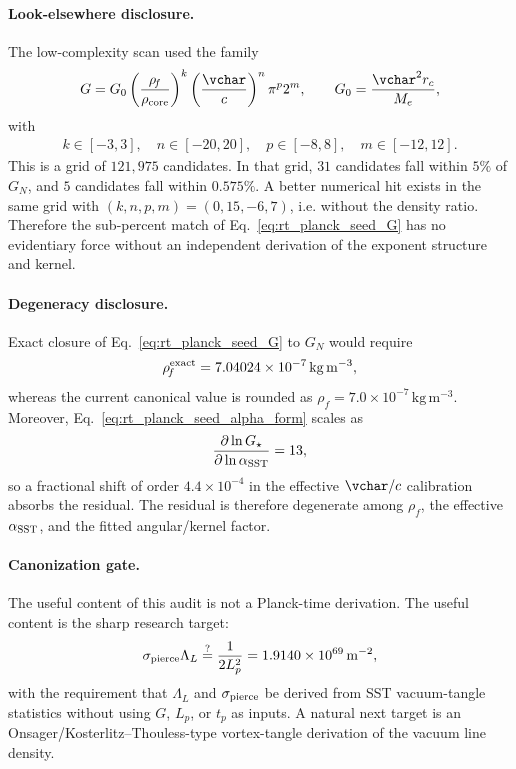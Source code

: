 \paragraph{Look-elsewhere disclosure.}
The low-complexity scan used the family
\begin{align}
    G
    =
    G_0
    \left(\frac{\rho_{\!f}}{\rho_{\rm core}}\right)^k
    \left(\frac{\vchar}{c}\right)^n
    \pi^p2^m,
    \qquad
    G_0=\frac{\vchar^2r_c}{M_e},
\end{align}
with
\begin{align}
    k\in[-3,3],\quad
    n\in[-20,20],\quad
    p\in[-8,8],\quad
    m\in[-12,12].
\end{align}
This is a grid of \(121{,}975\) candidates.  In that grid, \(31\) candidates
fall within \(5\%\) of \(G_N\), and \(5\) candidates fall within
\(0.575\%\).  A better numerical hit exists in the same grid with
\((k,n,p,m)=(0,15,-6,7)\), i.e. without the density ratio.  Therefore the
sub-percent match of Eq.~\eqref{eq:rt_planck_seed_G} has no evidentiary force
without an independent derivation of the exponent structure and kernel.

\paragraph{Degeneracy disclosure.}
Exact closure of Eq.~\eqref{eq:rt_planck_seed_G} to \(G_N\) would require
\begin{align}
    \rho_{\!f}^{\rm exact}
    =
    7.04024\times10^{-7}\,\mathrm{kg\,m^{-3}},
\end{align}
whereas the current canonical value is rounded as
\(\rho_{\!f}=7.0\times10^{-7}\,\mathrm{kg\,m^{-3}}\).  Moreover,
Eq.~\eqref{eq:rt_planck_seed_alpha_form} scales as
\begin{align}
    \frac{\partial\ln G_{\star}}{\partial\ln\alpha_{\rm SST}}=13,
\end{align}
so a fractional shift of order \(4.4\times10^{-4}\) in the effective
\(\vchar/c\) calibration absorbs the residual.  The residual is therefore
degenerate among \(\rho_{\!f}\), the effective \(\alpha_{\rm SST}\), and the
fitted angular/kernel factor.

\paragraph{Canonization gate.}
The useful content of this audit is not a Planck-time derivation.  The useful
content is the sharp research target:
\begin{align}
    \sigma_{\rm pierce}\Lambda_L
    \stackrel{?}{=}
    \frac{1}{2L_p^2}
    =
    1.9140\times10^{69}\,\mathrm{m^{-2}},
\end{align}
with the requirement that \(\Lambda_L\) and \(\sigma_{\rm pierce}\) be derived
from SST vacuum-tangle statistics without using \(G\), \(L_p\), or \(t_p\) as
inputs.  A natural next target is an Onsager/Kosterlitz--Thouless-type
vortex-tangle derivation of the vacuum line density.
